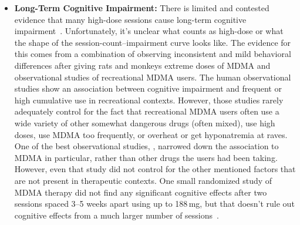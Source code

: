 \documentclass[11pt,oneside]{book}
\let\cite\parencite
\begin{document}
\begin{itemize}
    A dose of MDMA that is not neurotoxic in a single administration can also become neurotoxic when additional session are done before the antioxidant system has recovered~\cite{baggottDamage}. Unfortunately, it's not known how long this recovery takes. It's also unclear whether this oxidative damage has any clinically significant effects.
    \item \textbf{Long-Term Cognitive Impairment:} There is limited and contested evidence that many high-dose sessions cause long-term cognitive impairment~\cite{baggottDamage}. Unfortunately, it's unclear what counts as high-dose or what the shape of the session-count--impairment curve looks like. The evidence for this comes from a combination of observing inconsistent and mild behavioral differences after giving rats and monkeys extreme doses of MDMA and observational studies of recreational MDMA users. The human observational studies show an association between cognitive impairment and frequent or high cumulative use in recreational contexts. However, those studies rarely adequately control for the fact that recreational MDMA users often use a wide variety of other somewhat dangerous drugs (often mixed), use high doses, use MDMA too frequently, or overheat or get hyponatremia at raves. One of the best observational studies, \textcite{corayMemory}, narrowed down the association to MDMA in particular, rather than other drugs the users had been taking. However, even that study did not control for the other mentioned factors that are not present in therapeutic contexts. One small randomized study of MDMA therapy did not find any significant cognitive effects after two sessions spaced 3--5 weeks apart using up to 188\,mg, but that doesn't rule out cognitive effects from a much larger number of sessions~\cite{mithoeferSafety}.
\end{itemize}
\end{document}
